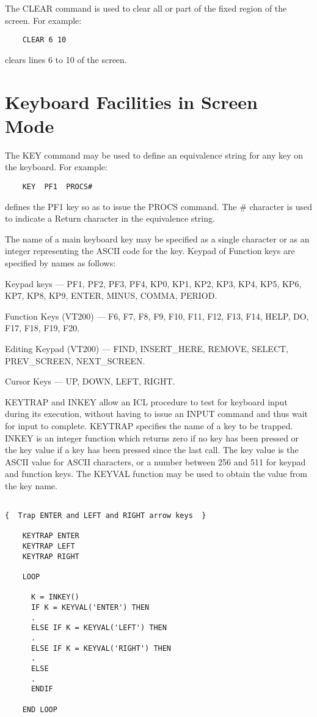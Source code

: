 The CLEAR command is used to clear all or part of the fixed region of the
screen. For example:
\begin{verbatim}
    CLEAR 6 10
\end{verbatim}
clears lines 6 to 10 of the screen.

\section{Keyboard Facilities in Screen Mode} 

The KEY command may be used to define an equivalence string for any key
on the keyboard. For example:
\begin{verbatim}
    KEY  PF1  PROCS#
\end{verbatim}
defines the PF1 key so as to issue the PROCS command. The \# character is
used to indicate a Return character in the equivalence string.

The name of a main keyboard key may be specified as a single character or
as an integer representing the ASCII code for the key. Keypad of Function
keys are specified by names as follows:

Keypad keys --- PF1, PF2, PF3, PF4, KP0, KP1, KP2, KP3, KP4, KP5, KP6, KP7,
KP8, KP9, ENTER, MINUS, COMMA, PERIOD.

Function Keys (VT200) --- F6, F7, F8, F9, F10, F11, F12, F13, F14, HELP,
DO, F17, F18, F19, F20.

Editing Keypad (VT200) --- FIND, INSERT\_HERE, REMOVE, SELECT, PREV\_SCREEN,
NEXT\_SCREEN.

Cursor Keys --- UP, DOWN, LEFT, RIGHT.

KEYTRAP and INKEY allow an ICL procedure to test for keyboard input during
its execution, without having to issue an INPUT command and thus wait for
input to complete. KEYTRAP specifies the name of a key to be trapped. INKEY
is an integer function which returns zero if no key has been pressed or
the key value if a key has been pressed since the last call. The key value
is the ASCII value for ASCII characters, or a number between 256 and 511
for keypad and function keys. The KEYVAL function may be used to obtain
the value from the key name.

\begin{verbatim}
                 
{  Trap ENTER and LEFT and RIGHT arrow keys  }

    KEYTRAP ENTER
    KEYTRAP LEFT
    KEYTRAP RIGHT
                                              
    LOOP

      K = INKEY()
      IF K = KEYVAL('ENTER') THEN
      .
      ELSE IF K = KEYVAL('LEFT') THEN
      .
      ELSE IF K = KEYVAL('RIGHT') THEN
      .
      ELSE
      .
      ENDIF

    END LOOP
       
\end{verbatim}

